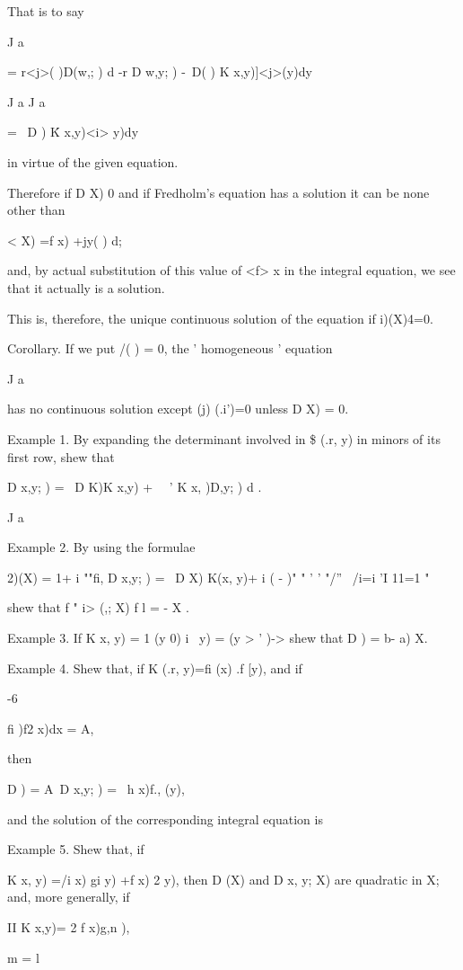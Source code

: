 %
%

That is to say

J a

= r<j>( )D(w,; ) d -r D w,y; ) -\ D( ) K x,y)]<j>(y)dy

J a J a

= \ D ) \' K x,y)<i> y)dy

in virtue of the given equation.

Therefore if D X) 0 and if Fredholm's equation has a solution it can
be none other than

< X) =f x) +jy( ) d;

and, by actual substitution of this value of <f> x in the integral
equation, we see that it actually is a solution.

This is, therefore, the unique continuous solution of the equation if
i)(X)4=0.

Corollary. If we put /( ) = 0, the ' homogeneous ' equation

J a

has no continuous solution except (j) (.i')=0 unless D X) = 0.

Example 1. By expanding the determinant involved in \$ (.r, y) in
minors of its first row, shew that

D x,y; ) = \ D K)K x,y) + \ \ ' K x, )D,y; ) d .

J a

Example 2. By using the formulae

2)(X) = 1+ i ""fi, D x,y; ) = \ D X) K(x, y)+ i ( - )" " ' ' "/'' \
/i=i 'I 11=1 "

shew that f " i> (,; X) f l = - X .

Example 3. If K x, y) = 1 (y 0) i \ y) = (y > ' )-> shew that D ) = b-
a) X.

Example 4. Shew that, if K (.r, y)=fi (x) .f [y), and if

-6

fi )f2 x)dx = A,

then

D ) = A\ D x,y; ) = \ h x)f., (y),

and the solution of the corresponding integral equation is

%
%

Example 5. Shew that, if

K x, y) =/i x) gi y) +f x) 2 y), then D (X) and D x, y; X) are
quadratic in X; and, more generally, if

II K x,y)= 2 f x)g,n ),

m = l

